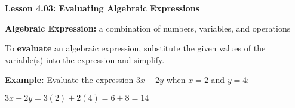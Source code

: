 \begin{center}
\textbf{Lesson 4.03: Evaluating Algebraic Expressions}
\end{center}

\vspace*{-1.5ex}

\noindent \textbf{Algebraic Expression:} a combination of numbers, variables, and operations

\noindent To \textbf{evaluate} an algebraic expression, substitute the given values of the variable(s) into the expression and simplify.

\noindent \textbf{Example:}
Evaluate the expression \(3x + 2y\) when \(x = 2\) and \(y = 4\):

{\centering $ 
3x + 2y = 3(2) + 2(4) = 6 + 8 = 14
 $\par}

